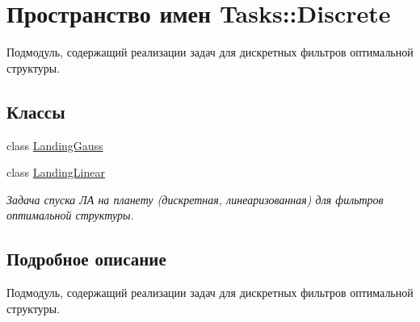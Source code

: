 \hypertarget{namespace_tasks_1_1_discrete}{}\section{Пространство имен Tasks\+:\+:Discrete}
\label{namespace_tasks_1_1_discrete}


Подмодуль, содержащий реализации задач для дискретных фильтров оптимальной структуры.  


\subsection*{Классы}
\begin{DoxyCompactItemize}
\item 
class \hyperlink{class_tasks_1_1_discrete_1_1_landing_gauss}{Landing\+Gauss}
\item 
class \hyperlink{class_tasks_1_1_discrete_1_1_landing_linear}{Landing\+Linear}
\begin{DoxyCompactList}\small\item\em Задача спуска ЛА на планету (дискретная, линеаризованная) для фильтров оптимальной структуры. \end{DoxyCompactList}\end{DoxyCompactItemize}


\subsection{Подробное описание}
Подмодуль, содержащий реализации задач для дискретных фильтров оптимальной структуры. 